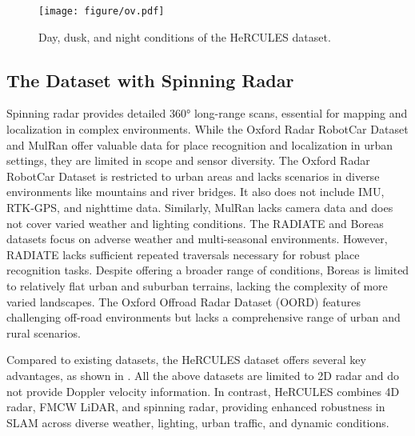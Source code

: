 \begin{figure}[!t]
    \centering
    \texttt{[image: figure/ov.pdf]}
    \caption{Day, dusk, and night conditions of the HeRCULES dataset.}
    \label{fig:overview}
    \vspace{-8mm}
\end{figure}



\subsection{The Dataset with Spinning Radar}
Spinning radar provides detailed 360° long-range scans, essential for mapping and localization in complex environments. While the Oxford Radar RobotCar Dataset \cite{barnes2020oxford} and MulRan \cite{kim2020mulran} offer valuable data for place recognition and localization in urban settings, they are limited in scope and sensor diversity. The Oxford Radar RobotCar Dataset is restricted to urban areas and lacks scenarios in diverse environments like mountains and river bridges. It also does not include \ac{IMU}, RTK-GPS, and nighttime data. Similarly, MulRan lacks camera data and does not cover varied weather and lighting conditions. The RADIATE \cite{sheeny2021radiate} and Boreas \cite{burnett2023boreas} datasets focus on adverse weather and multi-seasonal environments. However, RADIATE lacks sufficient repeated traversals necessary for robust place recognition tasks. Despite offering a broader range of conditions, Boreas is limited to relatively flat urban and suburban terrains, lacking the complexity of more varied landscapes. The Oxford Offroad Radar Dataset (OORD) \cite{gadd2024oord} features challenging off-road environments but lacks a comprehensive range of urban and rural scenarios.

Compared to existing datasets, the HeRCULES dataset offers several key advantages, as shown in . All the above datasets are limited to 2D radar and do not provide Doppler velocity information. In contrast, HeRCULES combines 4D radar, \ac{FMCW} \ac{LiDAR}, and spinning radar, providing enhanced robustness in SLAM across diverse weather, lighting, urban traffic, and dynamic conditions.
